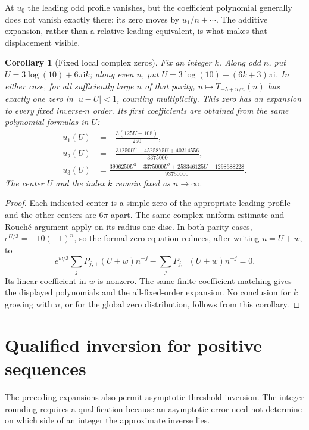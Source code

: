 \documentclass[11pt,letterpaper]{article}
\numberwithin{equation}{section}
\newtheorem{corollary}[theorem]{Corollary}
\theoremstyle{definition}\newtheorem{definition}[theorem]{Definition}
\theoremstyle{remark}\newtheorem{remark}[theorem]{Remark}
\newcommand{\ii}{\mathrm i}
\begin{document}
At $u_0$ the leading odd profile vanishes, but the coefficient polynomial generally does not vanish exactly there; its zero moves by $u_1/n+\cdots$. The additive expansion, rather than a relative leading equivalent, is what makes that displacement visible.


\begin{corollary}[Fixed local complex zeros]
\label{cmz:cor:complexzeros}
Fix an integer $k$. Along odd $n$, put $U=3\log(10)+6\pi\ii k$; along even $n$, put $U=3\log(10)+(6k+3)\pi\ii$. In either case, for all sufficiently large $n$ of that parity, $u\mapsto T_{-5+u/n}(n)$ has exactly one zero in $|u-U|<1$, counting multiplicity. This zero has an expansion to every fixed inverse-$n$ order. Its first coefficients are obtained from the same polynomial formulas in $U$:
\begin{align*}
u_1(U)&=-\frac{3(125U-108)}{250},\\
u_2(U)&=-\frac{31250U^3-4525875U+40214556}{3375000},\\
u_3(U)&=\frac{3906250U^3-3375000U^2+258346125U-1298688228}{93750000}.
\end{align*}
The center $U$ and the index $k$ remain fixed as $n\to\infty$.
\end{corollary}
\begin{proof}
Each indicated center is a simple zero of the appropriate leading profile and the other centers are $6\pi$ apart. The same complex-uniform estimate and Rouch\'e argument apply on its radius-one disc. In both parity cases,
$e^{U/3}=-10(-1)^n$, so the formal zero equation reduces, after writing $u=U+w$, to
\[
e^{w/3}\sum_jP_{j,+}(U+w)n^{-j}
-\sum_jP_{j,-}(U+w)n^{-j}=0.
\]
Its linear coefficient in $w$ is nonzero. The same finite coefficient matching gives the displayed polynomials and the all-fixed-order expansion. No conclusion for $k$ growing with $n$, or for the global zero distribution, follows from this corollary.
\end{proof}

\section{Qualified inversion for positive sequences}
\label{cmz:sec:inverse}
The preceding expansions also permit asymptotic threshold inversion. The integer rounding requires a qualification because an asymptotic error need not determine on which side of an integer the approximate inverse lies.
\end{document}
